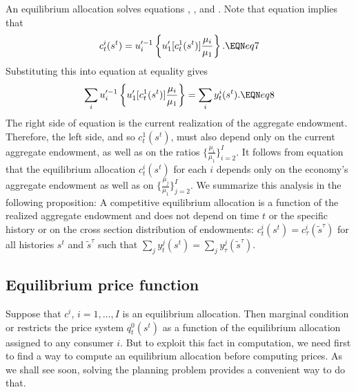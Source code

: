 An equilibrium allocation solves equations  ,  ,
and . Note that equation  implies that
$$ c_t^i(s^t) = u^{\prime -1}_i  \left\{u'_1[c_t^1(s^t)] {\mu_i \over \mu_1}
 \right\}. \EQN eq7 $$
Substituting this into equation  at equality gives
$$ \sum_i
u^{\prime -1}_i  \left\{u'_1[c_t^1(s^t)] {\mu_i \over \mu_1}\right\} =
       \sum_i y_t^i(s^t) .  \EQN eq8 $$
The right side of equation  is the current realization of
the aggregate endowment. %
Therefore, the left
side, and  so $c_t^1(s^t)$,  must also depend only on the current
aggregate endowment, as well as on the ratios
$\{ {\frac{\mu_i}{\mu_1}} \}_{i=2}^I$.  It follows from equation  that the
equilibrium allocation $c_t^i(s^t)$ for each $i$ depends only on
the economy's aggregate endowment as well as on
$\{ {\frac{\mu_j}{\mu_1}} \}_{j=2}^I$. We summarize this analysis  in
the following proposition:
\medskip
{}  A competitive equilibrium allocation
is a function of the realized aggregate endowment and does not depend
on time $t$ or the specific history or on
the cross section distribution of endowments:
$c_t^i(s^t)=c_\tau^i(\tilde s^{\tau})$ for all histories $s^t$ and $\tilde
s^{\tau}$ such that $\sum_j y_t^j(s^t) = \sum_j y_\tau^j(\tilde
s^{\tau})$.


\medskip








\subsection{Equilibrium price function}
  Suppose that $c^i$, $i=1, \ldots, I$  is an equilibrium allocation.
Then    marginal condition  or  restricts
the price system $q_t^0(s^t)$ as a function of the equilibrium allocation assigned
to any consumer $i$. But to exploit this fact in computation, we need  first to find a way  to compute
an equilibrium allocation before  computing prices.  As we shall see soon, solving the planning problem provides a convenient way
to do that.


